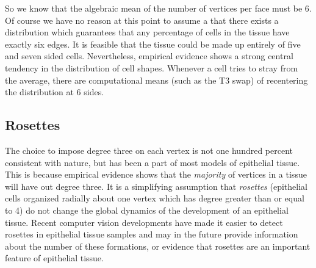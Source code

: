 So we know that the algebraic mean of the number of vertices per face must be 6. Of course we have no reason at this point to assume a that there exists a distribution which guarantees that any percentage of cells in the tissue have exactly six edges. It is feasible that the tissue could be made up entirely of five and seven sided cells. Nevertheless, empirical evidence shows a strong central tendency in the distribution of cell shapes. Whenever a cell tries to stray from the average, there are computational means (such as the T3 swap) of recentering the distribution at 6 sides.

\subsection{Rosettes}
The choice to impose degree three on each vertex is not one hundred percent consistent with nature, but has been a part of most models of epithelial tissue. This is because empirical evidence shows that the \emph{majority} of vertices in a tissue will have out degree three. It is a simplifying assumption that \emph{rosettes} (epithelial cells organized radially about one vertex which has degree greater than or equal to 4) do not change the global dynamics of the development of an epithelial tissue.  Recent computer vision developments \cite{rose} have made it easier to detect rosettes in epithelial tissue samples and may in the future provide information about the number of these formations, or evidence that rosettes are an important feature of epithelial tissue. 
